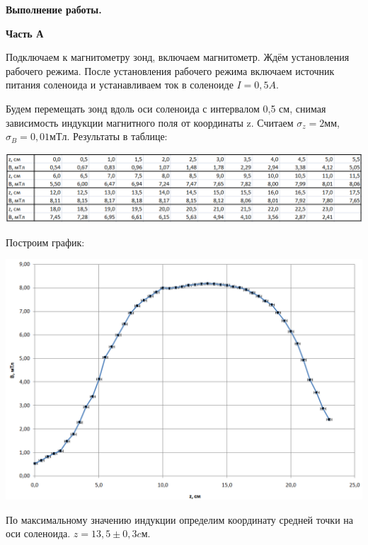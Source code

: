 \documentclass[12pt]{article}
\begin{document}
    \begin{center}
    	\textbf{\large Выполнение работы.}
    \end{center}
    
    \textbf{\large Часть А}
    \newline
    
    Подключаем к магнитометру зонд, включаем магнитометр. Ждём установления рабочего режима. После установления рабочего режима включаем источник питания соленоида и устанавливаем ток в соленоиде $I = 0,5 A$.
    
    Будем перемещать зонд вдоль оси соленоида с интервалом 0,5 см, снимая зависимость индукции магнитного поля от координаты z. Считаем $\sigma_z = 2 мм$, $\sigma_B = 0,01 мТл$. Результаты в таблице:
    
    \begin{center}
    	\includegraphics[width=16cm]{table1.png}
    \end{center}
    
    Построим график:
    
    \begin{center}
    	\includegraphics[width=18cm]{graph1.png}
    \end{center}
    
    По максимальному значению индукции определим координату средней точки на оси соленоида. $z=13,5 \pm 0,3 cм$.
    
\end{document}
